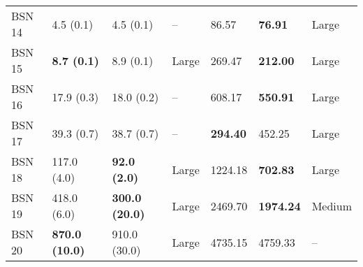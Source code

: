 \begin{tabular}{lllllll}
BSN 14 &             4.5 (0.1) &             4.5 (0.1) &          -- &                   86.57 &           \textbf{76.91} &       Large \\
BSN 15 &    \textbf{8.7 (0.1)} &             8.9 (0.1) &       Large &                  269.47 &          \textbf{212.00} &       Large \\
BSN 16 &            17.9 (0.3) &            18.0 (0.2) &          -- &                  608.17 &          \textbf{550.91} &       Large \\
BSN 17 &            39.3 (0.7) &            38.7 (0.7) &          -- &         \textbf{294.40} &                   452.25 &       Large \\
BSN 18 &           117.0 (4.0) &   \textbf{92.0 (2.0)} &       Large &                 1224.18 &          \textbf{702.83} &       Large \\
BSN 19 &           418.0 (6.0) & \textbf{300.0 (20.0)} &       Large &                 2469.70 &         \textbf{1974.24} &      Medium \\
BSN 20 & \textbf{870.0 (10.0)} &          910.0 (30.0) &       Large &                 4735.15 &                  4759.33 &          -- \\
\bottomrule
\end{tabular}
